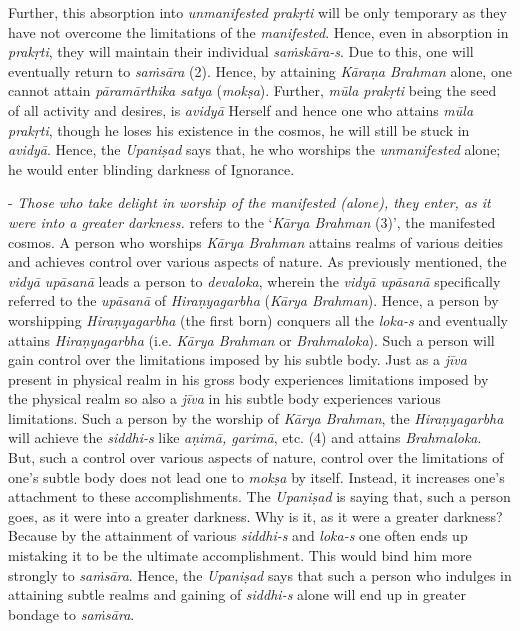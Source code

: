 Further, this absorption into \emph{unmanifested} \emph{prakṛti} will be only temporary as they have not overcome the limitations of the \emph{manifested}. Hence, even in absorption in \emph{prakṛti}, they will maintain their individual \emph{saṁskāra-s}. Due to this, one will eventually return to \emph{saṁsāra} (2). Hence, by attaining \emph{Kāraṇa Brahman} alone, one cannot attain \emph{pāramārthika satya} (\emph{mokṣa}). Further, \emph{mūla prakṛti} being the seed of all activity and desires, is \emph{avidyā} Herself and hence one who attains \emph{mūla prakṛti}, though he loses his existence in the cosmos, he will still be stuck in \emph{avidyā}. Hence, the \emph{Upaniṣad} says that, he who worships the \emph{unmanifested} alone; he would enter blinding darkness of Ignorance.

- \emph{Those who take delight in worship of the manifested (alone), they enter, as it were into a greater darkness.}  refers to the `\emph{Kārya Brahman} (3)', the manifested cosmos. A person who worships \emph{Kārya Brahman} attains realms of various deities and achieves control over various aspects of nature. As previously mentioned, the \emph{vidyā upāsanā} leads a person to \emph{devaloka}, wherein the \emph{vidyā upāsanā} specifically referred to the \emph{upāsanā} of \emph{Hiraṇyagarbha} (\emph{Kārya Brahman}). Hence, a person by worshipping \emph{Hiraṇyagarbha} (the first born) conquers all the \emph{loka-s} and eventually attains \emph{Hiraṇyagarbha} (i.e. \emph{Kārya Brahman} or \emph{Brahmaloka}). Such a person will gain control over the limitations imposed by his subtle body. Just as a \emph{jīva} present in physical realm in his gross body experiences limitations imposed by the physical realm so also a \emph{jīva} in his subtle body experiences various limitations. Such a person by the worship of \emph{Kārya Brahman}, the \emph{Hiraṇyagarbha} will achieve the \emph{siddhi-s} like \emph{aṇimā, garimā}, etc. (4) and attains \emph{Brahmaloka}. But, such a control over various aspects of nature, control over the limitations of one's subtle body does not lead one to \emph{mokṣa} by itself. Instead, it increases one's attachment to these accomplishments. The \emph{Upaniṣad} is saying that, such a person goes, as it were into a greater darkness. Why is it, as it were a greater darkness? Because by the attainment of various \emph{siddhi-s} and \emph{loka-s} one often ends up mistaking it to be the ultimate accomplishment. This would bind him more strongly to \emph{saṁsāra}. Hence, the \emph{Upaniṣad} says that such a person who indulges in attaining subtle realms and gaining of \emph{siddhi-s} alone will end up in greater bondage to \emph{saṁsāra}.
\newpage


